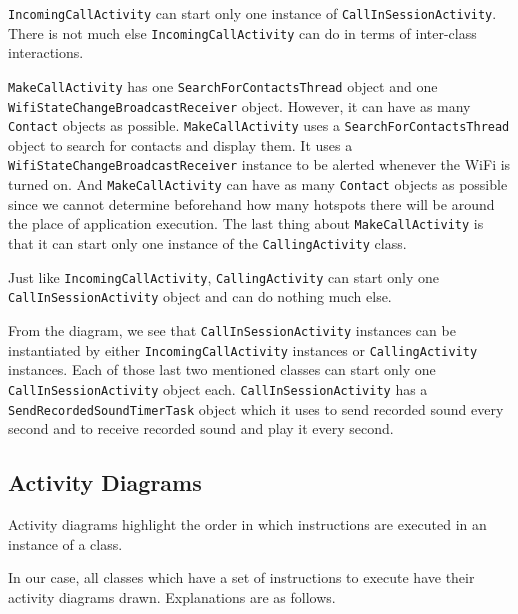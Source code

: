 \documentclass[12pt,svgnames,smaller]{article} %
\begin{document}
	\texttt{IncomingCallActivity} can start only one instance of \texttt{CallInSessionActivity}. There is not much else \texttt{IncomingCallActivity} can do in terms of inter-class interactions.
	
	\texttt{MakeCallActivity} has one \texttt{SearchForContactsThread} object and one \texttt{WifiStateChangeBroadcastReceiver} object. However, it can have as many \texttt{Contact} objects as possible. \texttt{MakeCallActivity} uses a \texttt{SearchForContactsThread} object to search for contacts and display them. It uses a \texttt{WifiStateChangeBroadcastReceiver} instance to be alerted whenever the WiFi is turned on. And \texttt{MakeCallActivity} can have as many \texttt{Contact} objects as possible since  we cannot determine beforehand how many hotspots there will be around the place of application execution. The last thing about \texttt{MakeCallActivity} is that it can start only one instance of the \texttt{CallingActivity} class. 
	
	Just like \texttt{IncomingCallActivity}, \texttt{CallingActivity} can start only one \texttt{CallInSessionActivity} object and can do nothing much else.
	
	From the diagram, we see that \texttt{CallInSessionActivity} instances can be instantiated by either \texttt{IncomingCallActivity} instances or \texttt{CallingActivity} instances. Each of those last two mentioned classes can start only one \texttt{CallInSessionActivity} object each. \texttt{CallInSessionActivity} has a \texttt{SendRecordedSoundTimerTask} object which it uses to send recorded sound every second and to receive recorded sound and play it every second.
	
	
	\subsection{Activity Diagrams}

	Activity diagrams highlight the order in which instructions are executed in an instance of a class.
	
	In our case, all classes which have a set of instructions to execute have their activity diagrams drawn. Explanations are as follows.
	
\end{document}
